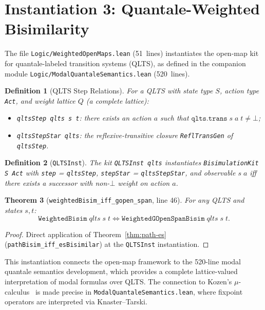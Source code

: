 \documentclass[11pt]{article}
\newtheorem{theorem}{Theorem}[section]
\newtheorem{definition}[theorem]{Definition}
\begin{document}
\section{Instantiation 3: Quantale-Weighted Bisimilarity}\label{sec:weighted}

The file \texttt{Logic/WeightedOpenMaps.lean} (51~lines) instantiates
the open-map kit for quantale-labeled transition systems (QLTS), as
defined in the companion module
\texttt{Logic/ModalQuantaleSemantics.lean} (520~lines).

\begin{definition}[QLTS Step Relations]
For a QLTS with state type $S$, action type \texttt{Act}, and weight
lattice $Q$ (a complete lattice):
\begin{itemize}
\item \texttt{qltsStep qlts s t}: there exists an action $a$ such that
  $\texttt{qlts.trans}\;s\;a\;t \neq \bot$;
\item \texttt{qltsStepStar qlts}: the reflexive-transitive closure
  \texttt{ReflTransGen} of \texttt{qltsStep}.
\end{itemize}
\end{definition}

\begin{definition}[\texttt{QLTSInst}]
The kit \texttt{QLTSInst qlts} instantiates
\texttt{BisimulationKit S Act} with \texttt{step} = \texttt{qltsStep},
\texttt{stepStar} = \texttt{qltsStepStar}, and observable $s\;a$ iff
there exists a successor with non-$\bot$ weight on action $a$.
\end{definition}

\begin{theorem}[\texttt{weightedBisim\_iff\_gopen\_span}, line 46]\label{thm:weighted}
For any QLTS and states $s, t$:
\[
  \texttt{WeightedBisim}\;\mathit{qlts}\;s\;t \iff
  \texttt{WeightedGOpenSpanBisim}\;\mathit{qlts}\;s\;t.
\]
\end{theorem}
\begin{proof}
Direct application of Theorem~\ref{thm:path-es}
(\texttt{pathBisim\_iff\_esBisimilar}) at the \texttt{QLTSInst}
instantiation.
\end{proof}

This instantiation connects the open-map framework to the 520-line
modal quantale semantics development, which provides a complete
lattice-valued interpretation of modal formulas over QLTS.  The
connection to Kozen's $\mu$-calculus~\cite{Kozen1983} is made precise
in \texttt{ModalQuantaleSemantics.lean}, where fixpoint operators are
interpreted via Knaster--Tarski.
\end{document}
